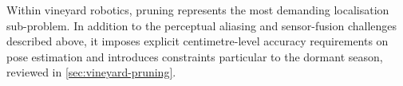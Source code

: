 Within vineyard robotics, pruning represents the most demanding localisation sub-problem. In addition to the perceptual aliasing and sensor-fusion challenges described above, it imposes explicit centimetre-level accuracy requirements on pose estimation and introduces constraints particular to the dormant season, reviewed in \cref{sec:vineyard-pruning}.